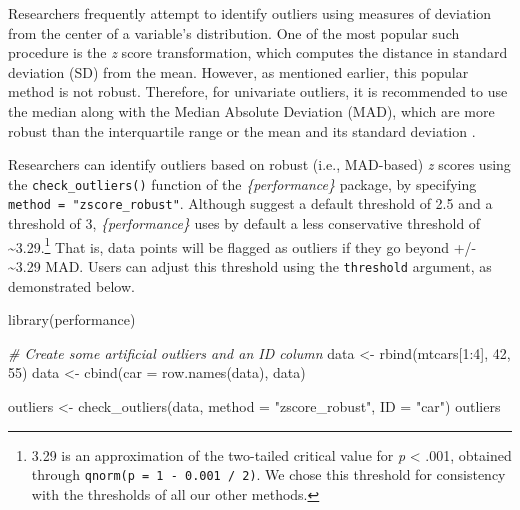 \documentclass[mathematics,article,submit,moreauthors,pdftex]{mdpi}
\newenvironment{Shaded}{\begin{snugshade}}{\end{snugshade}}
\newcommand{\AttributeTok}[1]{\textcolor[rgb]{0.77,0.63,0.00}{#1}}
\newcommand{\CommentTok}[1]{\textcolor[rgb]{0.56,0.35,0.01}{\textit{#1}}}
\newcommand{\DecValTok}[1]{\textcolor[rgb]{0.00,0.00,0.81}{#1}}
\newcommand{\FunctionTok}[1]{\textcolor[rgb]{0.00,0.00,0.00}{#1}}
\newcommand{\NormalTok}[1]{#1}
\newcommand{\OtherTok}[1]{\textcolor[rgb]{0.56,0.35,0.01}{#1}}
\newcommand{\SpecialCharTok}[1]{\textcolor[rgb]{0.00,0.00,0.00}{#1}}
\newcommand{\StringTok}[1]{\textcolor[rgb]{0.31,0.60,0.02}{#1}}
\begin{document}
Researchers frequently attempt to identify outliers using measures of
deviation from the center of a variable's distribution. One of the most
popular such procedure is the \emph{z} score transformation, which
computes the distance in standard deviation (SD) from the mean. However,
as mentioned earlier, this popular method is not robust. Therefore, for
univariate outliers, it is recommended to use the median along with the
Median Absolute Deviation (MAD), which are more robust than the
interquartile range or the mean and its standard deviation
\citep{leys2019outliers, leys2013outliers}.

Researchers can identify outliers based on robust (i.e., MAD-based)
\emph{z} scores using the \texttt{check\_outliers()} function of the
\emph{\{performance\}} package, by specifying
\texttt{method\ =\ "zscore\_robust"}. Although \citet{leys2013outliers}
suggest a default threshold of 2.5 and \citet{leys2019outliers} a
threshold of 3, \emph{\{performance\}} uses by default a less
conservative threshold of \textasciitilde3.29.\footnote{3.29 is an
  approximation of the two-tailed critical value for \emph{p}
  \textless{} .001, obtained through
  \texttt{qnorm(p\ =\ 1\ -\ 0.001\ /\ 2)}. We chose this threshold for
  consistency with the thresholds of all our other methods.} That is,
data points will be flagged as outliers if they go beyond +/-
\textasciitilde3.29 MAD. Users can adjust this threshold using the
\texttt{threshold} argument, as demonstrated below.

\begin{Shaded}
\begin{Highlighting}[]
\FunctionTok{library}\NormalTok{(performance)}

\CommentTok{\# Create some artificial outliers and an ID column}
\NormalTok{data }\OtherTok{\textless{}{-}} \FunctionTok{rbind}\NormalTok{(mtcars[}\DecValTok{1}\SpecialCharTok{:}\DecValTok{4}\NormalTok{], }\DecValTok{42}\NormalTok{, }\DecValTok{55}\NormalTok{)}
\NormalTok{data }\OtherTok{\textless{}{-}} \FunctionTok{cbind}\NormalTok{(}\AttributeTok{car =} \FunctionTok{row.names}\NormalTok{(data), data)}

\NormalTok{outliers }\OtherTok{\textless{}{-}} \FunctionTok{check\_outliers}\NormalTok{(data, }\AttributeTok{method =} \StringTok{"zscore\_robust"}\NormalTok{, }\AttributeTok{ID =} \StringTok{"car"}\NormalTok{)}
\NormalTok{outliers}
\end{Highlighting}
\end{Shaded}
\end{document}
